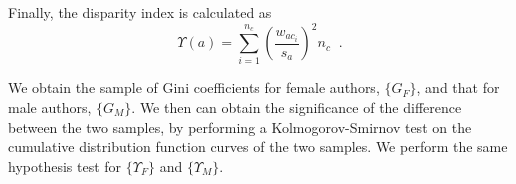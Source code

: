 \noindent
Finally, the disparity index is calculated as
\begin{equation}
\Upsilon(a) = \sum \limits_{i=1}^{n_c} \left( \frac{w_{ac_i}}{s_{a}} \right)^2 n_c\;\;.
\end{equation}

\noindent
We obtain the sample of Gini coefficients for female authors, $\{G_F\}$, and that for male authors, $\{G_M\}$. We then can obtain the significance of the difference between the two samples, by performing a Kolmogorov-Smirnov test on the cumulative distribution function curves of the two samples. We perform the same hypothesis test for $\{\Upsilon_F\}$ and $\{\Upsilon_M\}$.

